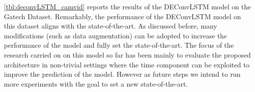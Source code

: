 

\autoref{tbl:deconvLSTM_camvid} reports the results of the DEConvLSTM model on
the Gatech Dataset. Remarkably, the performance of the DEConvLSTM model on this
dataset aligns with the state-of-the-art. As discussed before, many
modifications (such as data augmentation) can be adopted to increase the
performance of the model and fully set the state-of-the-art. The focus of the
research carried on on this model so far has been mainly to evaluate the
proposed architecture in non-trivial settings where the time component can be
exploited to improve the prediction of the model. However as future steps we
intend to run more experiments with the goal to set a new state-of-the-art.


\begin{table}[t]
    \caption{Results on the Gatech dataset. Pixel accuracy is reported.}
    \label{tbl:deconvLSTM_gatech}
\end{table}


